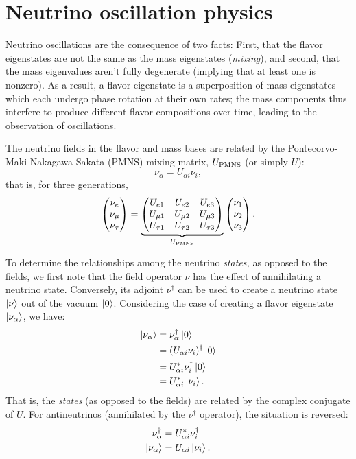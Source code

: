\documentclass[../thesis.tex]{subfiles}
\begin{document}
\section{Neutrino oscillation physics}
\label{sec:oscPhysics}

Neutrino oscillations are the consequence of two facts: First, that the flavor eigenstates are not the same as the mass eigenstates (\emph{mixing}), and second, that the mass eigenvalues aren't fully degenerate (implying that at least one is nonzero). As a result, a flavor eigenstate is a superposition of mass eigenstates which each undergo phase rotation at their own rates; the mass components thus interfere to produce different flavor compositions over time, leading to the observation of oscillations.

The neutrino fields in the flavor and mass bases are related by the Pontecorvo-Maki-Nakagawa-Sakata (PMNS) mixing matrix, $U_\mathrm{PMNS}$ (or simply $U$):
\begin{equation}
  \nu_\alpha = U_{\alpha i} \nu_i,
\end{equation}
that is, for three generations,
\begin{equation}
  \begin{pmatrix} \nu_e \\ \nu_\mu \\ \nu_\tau \end{pmatrix} = \underbrace{\begin{pmatrix} U_{e 1} & U_{e 2} & U_{e 3} \\ U_{\mu 1} & U_{\mu 2} & U_{\mu 3} \\ U_{\tau 1} & U_{\tau 2} & U_{\tau 3} \end{pmatrix}}_{U_\mathrm{PMNS}} \begin{pmatrix} \nu_1 \\ \nu_2 \\ \nu_3 \end{pmatrix}.
\end{equation}

To determine the relationships among the neutrino \emph{states,} as opposed to the fields, we first note that the field operator $\nu$ has the effect of annihilating a neutrino state. Conversely, its adjoint $\nu^\dagger$ can be used to create a neutrino state $\ket{\nu}$ out of the vacuum $\ket{0}$. Considering the case of creating a flavor eigenstate $\ket{\nu_\alpha}$, we have:
\begin{equation}
  \label{eq:nuStateRel}
  \begin{aligned}
    \ket{\nu_\alpha} &= \nu_\alpha^\dagger \ket{0} \\
    &= (U_{\alpha i} \nu_i)^\dagger \ket{0} \\
    &= U_{\alpha i}^* \nu_i^\dagger \ket{0} \\
    &= U_{\alpha i}^* \ket{\nu_i}.
  \end{aligned}
\end{equation}
That is, the \emph{states} (as opposed to the fields) are related by the complex conjugate of $U$. For antineutrinos (annihilated by the $\nu^\dagger$ operator), the situation is reversed:
\begin{equation}
  \label{eq:antiNuStateRel}
  \begin{aligned}
    \nu^\dagger_\alpha &= U_{\alpha i}^* \nu^\dagger_i \\
    \ket{\bar\nu_\alpha} &= U_{\alpha i} \ket{\bar\nu_i}.
  \end{aligned}
\end{equation}
\end{document}
